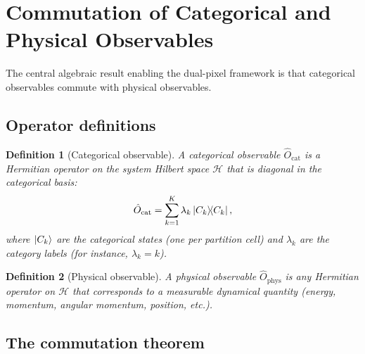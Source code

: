 \documentclass[11pt,twocolumn,a4paper]{article}
\newtheorem{definition}{Definition}
\newcommand{\Ocat}{\hat{O}_{\mathrm{cat}}}
\newcommand{\Ophys}{\hat{O}_{\mathrm{phys}}}
\newcommand{\hilbert}{\mathcal{H}}
\begin{document}
\section{Commutation of Categorical and Physical Observables}\label{sec:commutation}

The central algebraic result enabling the dual-pixel framework is that categorical observables commute with physical observables.

\subsection{Operator definitions}

\begin{definition}[Categorical observable]\label{def:catobs}
A categorical observable $\Ocat$ is a Hermitian operator on the system Hilbert space $\hilbert$ that is diagonal in the categorical basis:
\begin{equation}\label{eq:Ocat}
\Ocat = \sum_{k=1}^{K} \lambda_k \ketbra{C_k}{C_k},
\end{equation}
where $\ket{C_k}$ are the categorical states (one per partition cell) and $\lambda_k$ are the category labels (for instance, $\lambda_k = k$).
\end{definition}

\begin{definition}[Physical observable]\label{def:physobs}
A physical observable $\Ophys$ is any Hermitian operator on $\hilbert$ that corresponds to a measurable dynamical quantity (energy, momentum, angular momentum, position, etc.).
\end{definition}

\subsection{The commutation theorem}
\end{document}
